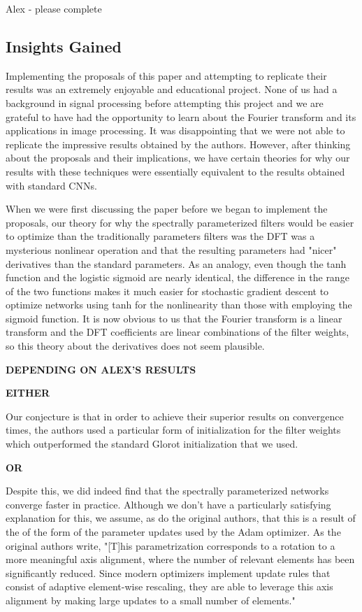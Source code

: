 \documentclass[10pt,journal,compsoc]{IEEEtran}
\begin{document}
Alex - please complete



\subsection{Insights Gained}

Implementing the proposals of this paper and attempting to replicate their results was an extremely enjoyable and educational project. None of us had a background in signal processing before attempting this project and we are grateful to have had the opportunity to learn about the Fourier transform and its applications in image processing. It was disappointing that we were not able to replicate the impressive results obtained by the authors. However, after thinking about the proposals and their implications, we have certain theories for why our results with these techniques were essentially equivalent to the results obtained with standard CNNs. 

When we were first discussing the paper before we began to implement the proposals, our theory for why the spectrally parameterized filters would be easier to optimize than the traditionally parameters filters was the DFT was a mysterious nonlinear operation and that the resulting parameters had "nicer" derivatives than the standard parameters. As an analogy, even though the tanh function and the logistic sigmoid are nearly identical, the difference in the range of the two functions makes it much easier for stochastic gradient descent to optimize networks using tanh for the nonlinearity than those with employing the sigmoid function. It is now obvious to us that the Fourier transform is a linear transform and the DFT coefficients are linear combinations of the filter weights, so this theory about the derivatives does not seem plausible. 

\textbf{DEPENDING ON ALEX'S RESULTS}

\textbf{EITHER}

Our conjecture is that in order to achieve their superior results on convergence times, the authors used a particular form of initialization for the filter weights which outperformed the standard Glorot initialization that we used. 

\textbf{OR}

Despite this, we did indeed find that the spectrally parameterized networks converge faster in practice. Although we don't have a particularly satisfying explanation for this, we assume, as do the original authors, that this is a result of the of the form of the parameter updates used by the Adam optimizer. As the original authors write, "[T]his parametrization corresponds to a rotation to a more meaningful axis alignment, where the number of relevant elements has been significantly reduced. Since modern optimizers implement update rules that consist of adaptive element-wise rescaling, they are able to leverage this axis alignment by making large updates to a small number of elements."
\end{document}
